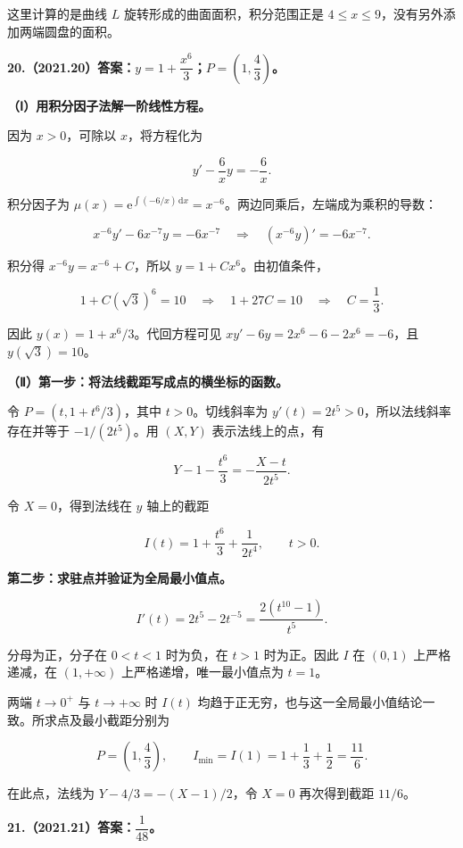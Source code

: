 \documentclass[UTF8,11pt,fontset=windows]{ctexart}
\begin{document}
这里计算的是曲线 $L$ 旋转形成的曲面面积，积分范围正是 $4\le x\le9$，没有另外添加两端圆盘的面积。

\clearpage

\textbf{20.（2021.20）答案：$y=1+\dfrac{x^6}{3}$；$P=(1,\dfrac43)$。}

\textbf{（Ⅰ）用积分因子法解一阶线性方程。}

因为 $x>0$，可除以 $x$，将方程化为

$$
y'-\frac6x y=-\frac6x.
$$

积分因子为 $\mu(x)=\mathrm e^{\int(-6/x)\,\mathrm dx}=x^{-6}$。两边同乘后，左端成为乘积的导数：

$$
x^{-6}y'-6x^{-7}y=-6x^{-7}
\quad\Longrightarrow\quad
(x^{-6}y)'=-6x^{-7}.
$$

积分得 $x^{-6}y=x^{-6}+C$，所以 $y=1+Cx^6$。由初值条件，

$$
1+C(\sqrt3)^6=10
\quad\Longrightarrow\quad 1+27C=10
\quad\Longrightarrow\quad C=\frac13.
$$

因此 $\boxed{y(x)=1+x^6/3}$。代回方程可见 $xy'-6y=2x^6-6-2x^6=-6$，且 $y(\sqrt3)=10$。

\textbf{（Ⅱ）第一步：将法线截距写成点的横坐标的函数。}

令 $P=(t,1+t^6/3)$，其中 $t>0$。切线斜率为 $y'(t)=2t^5>0$，所以法线斜率存在并等于 $-1/(2t^5)$。用 $(X,Y)$ 表示法线上的点，有

$$
Y-1-\frac{t^6}{3}=-\frac{X-t}{2t^5}.
$$

令 $X=0$，得到法线在 $y$ 轴上的截距

$$
I(t)=1+\frac{t^6}{3}+\frac1{2t^4},\qquad t>0.
$$

\textbf{第二步：求驻点并验证为全局最小值点。}

$$
I'(t)=2t^5-2t^{-5}=\frac{2(t^{10}-1)}{t^5}.
$$

分母为正，分子在 $0<t<1$ 时为负，在 $t>1$ 时为正。因此 $I$ 在 $(0,1)$ 上严格递减，在 $(1,+\infty)$ 上严格递增，唯一最小值点为 $t=1$。

两端 $t\to0^+$ 与 $t\to+\infty$ 时 $I(t)$ 均趋于正无穷，也与这一全局最小值结论一致。所求点及最小截距分别为

$$
\boxed{P=\left(1,\frac43\right)},
\qquad I_{\min}=I(1)=1+\frac13+\frac12=\frac{11}{6}.
$$

在此点，法线为 $Y-4/3=-(X-1)/2$，令 $X=0$ 再次得到截距 $11/6$。

\clearpage

\textbf{21.（2021.21）答案：$\dfrac1{48}$。}
\end{document}
